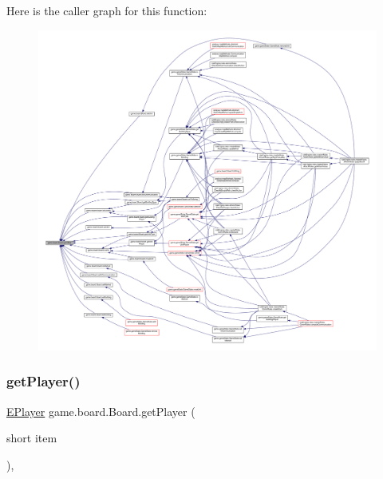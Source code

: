Here is the caller graph for this function\+:
\nopagebreak
\begin{figure}[H]
\begin{center}
\leavevmode
\includegraphics[width=350pt]{classgame_1_1board_1_1_board_a786604a4b98251823436860ea00aec16_icgraph}
\end{center}
\end{figure}
\mbox{\label{classgame_1_1board_1_1_board_ae5b7778e3e77c51eb44064d3a4521d71}} 
\subsubsection{\texorpdfstring{get\+Player()}{getPlayer()}}
{\footnotesize\ttfamily \mbox{\hyperlink{enumgame_1_1_e_player}{E\+Player}} game.\+board.\+Board.\+get\+Player (\begin{DoxyParamCaption}\item[{short}]{item }\end{DoxyParamCaption})\hspace{0.3cm}{\ttfamily [inline]}, {\ttfamily [private]}}

